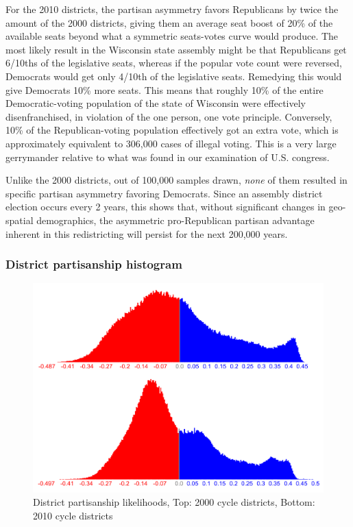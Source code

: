 \documentclass[preprint,12pt]{article}
\begin{document}
For the 2010 districts, the partisan asymmetry favors Republicans by twice the amount of the 2000 districts, giving them an average seat boost of 20\% of the available seats beyond what a symmetric seats-votes curve would produce.  
The most likely result in the Wisconsin state assembly might be that Republicans get 6/10ths of the legislative seats, whereas if the popular vote count were reversed, Democrats would get only 4/10th of the legislative seats.  
Remedying this would give Democrats 10\% more seats.  
This means that roughly 10\% of the entire Democratic-voting population of the state of Wisconsin were effectively disenfranchised, in violation of the one person, one vote principle.  
Conversely, 10\% of the Republican-voting population effectively got an extra vote, which is approximately equivalent to 306,000 cases of illegal voting.
This is a very large gerrymander relative to what was found in our examination of U.S. congress.

Unlike the 2000 districts, out of 100,000 samples drawn, \emph{none} of them resulted in specific partisan asymmetry favoring Democrats.  
Since an assembly district election occurs every 2 years, this shows that, without significant changes in geo-spatial demographics, the asymmetric pro-Republican partisan advantage inherent in this redistricting will persist for the next 200,000 years.

\subsubsection{District partisanship histogram}
  
\begin{figure}[htb!]
    \begin{center}
        \includegraphics[scale=0.25]{../Figures/WI_compared/district_partisanship_cropped.png}
        \caption{District partisanship likelihoods, Top: 2000 cycle districts, Bottom: 2010 cycle districts}\label{fig:LikelihoodsDistrictPartisanship}
    \end{center}
\end{figure}
\end{document}
